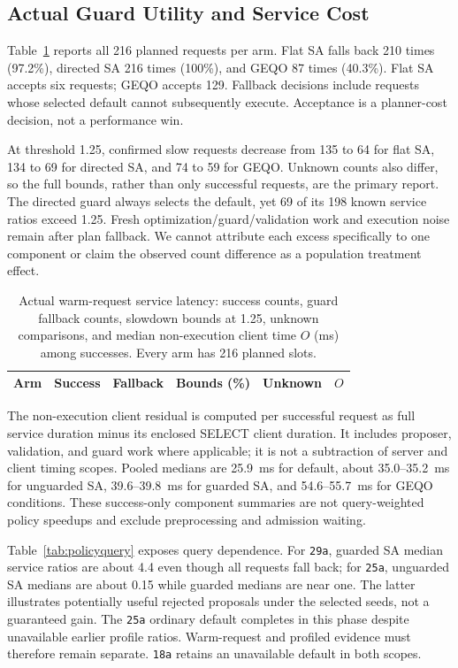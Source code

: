 \documentclass[conference]{IEEEtran}
\begin{document}
\subsection{Actual Guard Utility and Service Cost}
Table~\ref{tab:policy} reports all 216 planned requests per arm. Flat SA falls
back 210 times (97.2\%), directed SA 216 times (100\%), and GEQO 87 times
(40.3\%). Flat SA accepts six requests; GEQO accepts 129. Fallback decisions
include requests whose selected default cannot subsequently execute. Acceptance
is a planner-cost decision, not a performance win.

At threshold 1.25, confirmed slow requests decrease from 135 to 64 for flat SA,
134 to 69 for directed SA, and 74 to 59 for GEQO. Unknown counts also differ,
so the full bounds, rather than only successful requests, are the primary report.
The directed guard always selects the default, yet 69 of its 198 known service
ratios exceed 1.25. Fresh optimization/guard/validation work and execution noise
remain after plan fallback. We cannot attribute each excess specifically to
one component or claim the observed count difference as a population treatment
effect.

\begin{table}[t]
\caption{Actual warm-request service latency: success counts, guard fallback
counts, slowdown bounds at 1.25, unknown comparisons, and median non-execution
client time $O$ (ms) among successes. Every arm has 216 planned slots.}
\label{tab:policy}
\centering\scriptsize\setlength{\tabcolsep}{2.8pt}
\begin{tabular}{@{}lrrrrr@{}}\toprule
Arm & Success & Fallback & Bounds (\%) & Unknown & $O$\\\midrule

\end{tabular}
\end{table}

The non-execution client residual is computed per successful request as full
service duration minus its enclosed SELECT client duration. It includes proposer,
validation, and guard work where applicable; it is not a subtraction of server
and client timing scopes. Pooled medians are 25.9~ms for default, about
35.0--35.2~ms for unguarded SA, 39.6--39.8~ms for guarded SA, and 54.6--55.7~ms
for GEQO conditions. These success-only component summaries are not query-weighted
policy speedups and exclude preprocessing and admission waiting.

Table~\ref{tab:policyquery} exposes query dependence. For \texttt{29a}, guarded SA
median service ratios are about 4.4 even though all requests fall back; for
\texttt{25a}, unguarded SA medians are about 0.15 while guarded medians are near
one. The latter illustrates potentially useful rejected proposals under the
selected seeds, not a guaranteed gain. The \texttt{25a} ordinary default completes
in this phase despite unavailable earlier profile ratios. Warm-request and
profiled evidence must therefore remain separate. \texttt{18a} retains an
unavailable default in both scopes.
\end{document}

